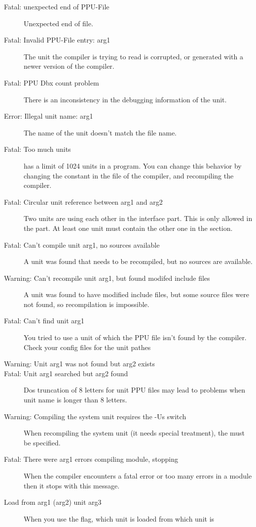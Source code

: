 \begin{description}
\item [Fatal: unexpected end of PPU-File]
 Unexpected end of file.
\item [Fatal: Invalid PPU-File entry: arg1]
 The unit the compiler is trying to read is corrupted, or generated with a
 newer version of the compiler.
\item [Fatal: PPU Dbx count problem]
 There is an inconsistency in the debugging information of the unit.
\item [Error: Illegal unit name: arg1]
 The name of the unit doesn't match the file name.
\item [Fatal: Too much units]
 \fpc has a limit of 1024 units in a program. You can change this behavior
 by changing the  constant in the  file of the
 compiler, and recompiling the compiler.
\item [Fatal: Circular unit reference between arg1 and arg2]
 Two units are using each other in the interface part. This is only allowed
 in the  part. At least one unit must contain the other one
 in the  section.
\item [Fatal: Can't compile unit arg1, no sources available]
 A unit was found that needs to be recompiled, but no sources are
 available.
\item [Warning: Can't recompile unit arg1, but found modifed include files]
 A unit was found to have modified include files, but
 some source files were not found, so recompilation is impossible.
\item [Fatal: Can't find unit arg1]
 You tried to use a unit of which the PPU file isn't found by the
 compiler. Check your config files for the unit pathes
\item [Warning: Unit arg1 was not found but arg2 exists]
\item [Fatal: Unit arg1 searched but arg2 found]
 Dos truncation of 8 letters for unit PPU files
 may lead to problems when unit name is longer than 8 letters.
\item [Warning: Compiling the system unit requires the -Us switch]
 When recompiling the system unit (it needs special treatment), the
  must be specified.
\item [Fatal: There were arg1 errors compiling module, stopping]
 When the compiler encounters a fatal error or too many errors in a module
 then it stops with this message.
\item [Load from arg1 (arg2) unit arg3]
 When you use the  flag, which unit is loaded from which unit is

\end{description}
